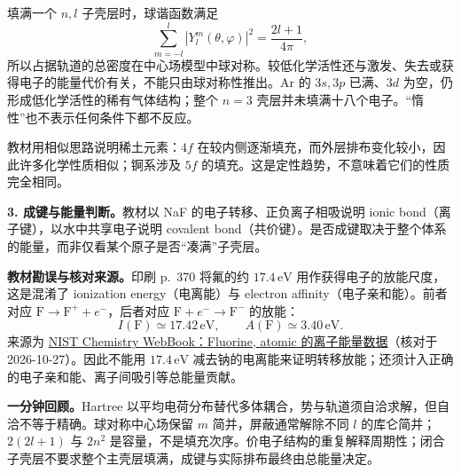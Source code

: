 填满一个 $n,l$ 子壳层时，球谐函数满足
\begin{equation}
  \sum_{m=-l}^{l}|Y_l^m(\theta,\varphi)|^2=\frac{2l+1}{4\pi},
\end{equation}
所以占据轨道的总密度在中心场模型中球对称。较低化学活性还与激发、失去或获得电子的能量代价有关，不能只由球对称性推出。Ar 的 $3s,3p$ 已满、$3d$ 为空，仍形成低化学活性的稀有气体结构；整个 $n=3$ 壳层并未填满十八个电子。“惰性”也不表示任何条件下都不反应。

教材用相似思路说明稀土元素：$4f$ 在较内侧逐渐填充，而外层排布变化较小，因此许多化学性质相似；锕系涉及 $5f$ 的填充。这是定性趋势，不意味着它们的性质完全相同。

\textbf{3. 成键与能量判断。}教材以 NaF 的电子转移、正负离子相吸说明 ionic bond（离子键），以水中共享电子说明 covalent bond（共价键）。是否成键取决于整个体系的能量，而非仅看某个原子是否“凑满”子壳层。

\textbf{教材勘误与核对来源。}印刷 p.~370 将氟的约 $17.4\,\mathrm{eV}$ 用作获得电子的放能尺度，这是混淆了 ionization energy（电离能）与 electron affinity（电子亲和能）。前者对应 $\mathrm F\to\mathrm F^++e^-$，后者对应 $\mathrm F+e^-\to\mathrm F^-$ 的放能：
\begin{equation}
  I(\mathrm F)\simeq17.42\,\mathrm{eV},\qquad
  A(\mathrm F)\simeq3.40\,\mathrm{eV}.
\end{equation}
来源为 \href{https://webbook.nist.gov/cgi/cbook.cgi?ID=C14762948\&Mask=20}{NIST Chemistry WebBook：Fluorine, atomic 的离子能量数据}（核对于 2026-10-27）。因此不能用 $17.4\,\mathrm{eV}$ 减去钠的电离能来证明转移放能；还须计入正确的电子亲和能、离子间吸引等总能量贡献。

\textbf{一分钟回顾。}Hartree 以平均电荷分布替代多体耦合，势与轨道须自洽求解，但自洽不等于精确。球对称中心场保留 $m$ 简并，屏蔽通常解除不同 $l$ 的库仑简并；$2(2l+1)$ 与 $2n^2$ 是容量，不是填充次序。价电子结构的重复解释周期性；闭合子壳层不要求整个主壳层填满，成键与实际排布最终由总能量决定。
